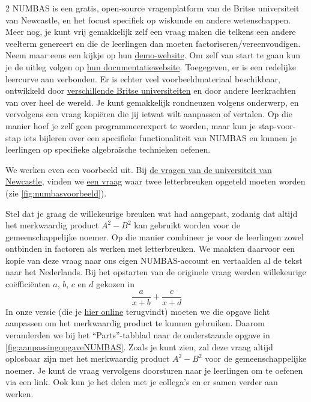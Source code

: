\begin{multicols} {2}
    NUMBAS is een gratis, open-source vragenplatform van de Britse universiteit van Newcastle, en het focust specifiek op wiskunde en andere wetenschappen.
    Meer nog, je kunt vrij gemakkelijk zelf een vraag maken die telkens een andere veelterm genereert en die de leerlingen dan moeten factoriseren/vereenvoudigen.
    Neem maar eens een kijkje op hun \href{https://numbas.mathcentre.ac.uk/exam/1973/numbas-website-demo/embed/}{demo-website}.
    Om zelf van start te gaan kun je de uitleg volgen op \href{https://docs.numbas.org.uk/en/latest/tutorials/write-question.html}{hun documentatiewebsite}.
    Toegegeven, er is een redelijke leercurve aan verbonden.
    Er is echter veel voorbeeldmateriaal beschikbaar, ontwikkeld door \href{https://numbas.mathcentre.ac.uk/explore/}{verschillende Britse universiteiten} en door andere leerkrachten van over heel de wereld.
    Je kunt gemakkelijk rondneuzen volgens onderwerp, en vervolgens een vraag kopiëren die jij ietwat wilt aanpassen of vertalen.
    Op die manier hoef je zelf geen programmeerexpert te worden, maar kun je stap-voor-stap iets bijleren over een specifieke functionaliteit van NUMBAS en kunnen je leerlingen op specifieke algebraïsche technieken oefenen.

    We werken even een voorbeeld uit.
    Bij \href{https://numbas.mathcentre.ac.uk/project/601/browse/Foundation%2520mathematics/}{de vragen van de universiteit van Newcastle}, vinden we \href{https://numbas.mathcentre.ac.uk/question/12000/combining-algebraic-fractions-1/preview/}{een vraag} waar twee letterbreuken opgeteld moeten worden (zie \autoref{fig:numbasvoorbeeld}).
    
    Stel dat je graag de willekeurige breuken wat had aangepast, zodanig dat altijd het merkwaardig product \(A^2-B^2\) kan gebruikt worden voor de gemeenschappelijke noemer.
    Op die manier combineer je voor de leerlingen zowel ontbinden in factoren als werken met letterbreuken.
    We maakten daarvoor een kopie van deze vraag naar ons eigen NUMBAS-account en vertaalden al de tekst naar het Nederlands.
    Bij het opstarten van de originele vraag werden willekeurige coëfficiënten \(a\), \(b\), \(c\) en \(d\) gekozen in
    \[
    \frac{a}{x+b} + \frac{c}{x+d}
    \]
    In onze versie (die je \href{https://numbas.mathcentre.ac.uk/question/155648/voorbeeld-uitwiskeling/}{hier online} terugvindt) moeten we die opgave licht aanpassen om het merkwaardig product te kunnen gebruiken.
    Daarom veranderden we bij het ``Parts''-tabblad naar de onderstaande opgave in \autoref{fig:aanpassingopgaveNUMBAS}.
    Zoals je kunt zien, zal deze vraag altijd oplosbaar zijn met het merkwaardig product \(A^2-B^2\) voor de gemeenschappelijke noemer.
    Je kunt de vraag vervolgens doorsturen naar je leerlingen om te oefenen via een link.
    Ook kun je het delen met je collega's en er samen verder aan werken.


\end{multicols}
